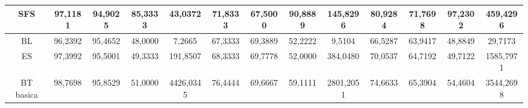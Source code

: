 \documentclass[12pt]{article}
\begin{document}
\begin{table}[H]
{\begin{tabular}{|c|cccc|cccc|cccc|}
SFS          & \multicolumn{1}{c|}{97,1181}                                                  & \multicolumn{1}{c|}{94,9025}                                                 & \multicolumn{1}{c|}{85,3333} & 43,0372   & \multicolumn{1}{c|}{71,8333}                                                  & \multicolumn{1}{c|}{67,5000}                                                 & \multicolumn{1}{c|}{90,8889} & 145,8296  & \multicolumn{1}{c|}{80,9284}                                                  & \multicolumn{1}{c|}{71,7698}                                                 & \multicolumn{1}{c|}{97,2302} & 459,4296  \\ \hline
BL           & \multicolumn{1}{c|}{96,2392}                                                  & \multicolumn{1}{c|}{95,4652}                                                 & \multicolumn{1}{c|}{48,0000} & 7,2665    & \multicolumn{1}{c|}{67,3333}                                                  & \multicolumn{1}{c|}{69,3889}                                                 & \multicolumn{1}{c|}{52,2222} & 9,5104    & \multicolumn{1}{c|}{66,5287}                                                  & \multicolumn{1}{c|}{63,9417}                                                 & \multicolumn{1}{c|}{48,8849} & 29,7173   \\ \hline
ES           & \multicolumn{1}{c|}{97,3992}                                                  & \multicolumn{1}{c|}{95,5001}                                                 & \multicolumn{1}{c|}{49,3333} & 191,8507  & \multicolumn{1}{c|}{68,3333}                                                  & \multicolumn{1}{c|}{69,7778}                                                 & \multicolumn{1}{c|}{52,0000} & 384,0480  & \multicolumn{1}{c|}{70,0537}                                                  & \multicolumn{1}{c|}{64,7192}                                                 & \multicolumn{1}{c|}{49,7122} & 1585,7971 \\ \hline
BT basica    & \multicolumn{1}{c|}{98,7698}                                                  & \multicolumn{1}{c|}{95,8529}                                                 & \multicolumn{1}{c|}{51,0000} & 4426,0345 & \multicolumn{1}{c|}{76,4444}                                                  & \multicolumn{1}{c|}{69,6667}                                                 & \multicolumn{1}{c|}{59,1111} & 2801,2051 & \multicolumn{1}{c|}{74,6633}                                                  & \multicolumn{1}{c|}{65,3904}                                                 & \multicolumn{1}{c|}{54,4604} & 3544,2698 \\ \hline

\end{tabular}}
\end{table}
\end{document}

